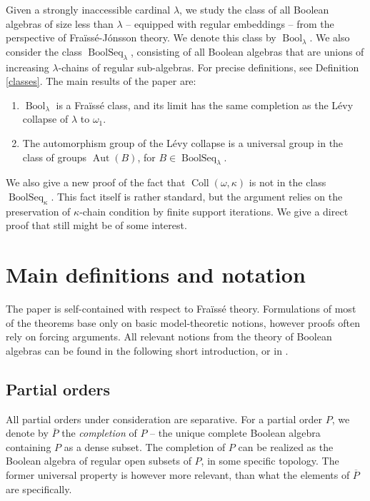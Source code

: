 \documentclass[11pt]{amsart}
\theoremstyle{definition}
\DeclareMathOperator{\Bool}{Bool}
\DeclareMathOperator{\BoolSeq}{BoolSeq}
\newcommand{\aut}{\operatorname{Aut}}
\newcommand{\coll}{\operatorname{Coll}(\omega,\kappa)}
\begin{document}
Given a strongly inaccessible cardinal $\lambda$, we study the class of all Boolean algebras of size less than $\lambda$ -- equipped with regular embeddings -- from the perspective of Fra\"iss\'e-J\'onsson theory. We denote this class by $\Bool_\lambda$. We also consider the class $\BoolSeq_\lambda$, consisting of all Boolean algebras that are unions of increasing $\lambda$-chains of regular sub-algebras. For precise definitions, see Definition \ref{classes}. The main results of the paper are:
\begin{enumerate}
    \item[A.] $\Bool_\lambda$ is a Fra\"iss\'e class, and its limit has the same completion as the L\'evy collapse of $\lambda$ to $\omega_1$. 
    \item[B.] The automorphism group of the L\'evy collapse is a universal group in the class of groups $\aut(B)$, for $B \in \BoolSeq_\lambda$. 
\end{enumerate}
We also give a new proof of the fact that $\coll$ is not in the class $\BoolSeq_\kappa$. This fact itself is rather standard, but the argument relies on the preservation of $\kappa$-chain condition by finite support iterations. We give a direct proof that still might be of some interest.


\section{Main definitions and notation}

The paper is self-contained with respect to Fra\"iss\'e theory. Formulations of most of the theorems base only on basic model-theoretic notions, however proofs often rely on forcing arguments. All relevant notions from the theory of Boolean algebras can be found in the following short introduction, or in \cite{bool}.

\subsection{Partial orders}

All partial orders under consideration are separative. For a partial order $P$, we denote by $\overline P$ the \emph{completion} of $P$ -- the unique complete Boolean algebra containing $P$ as a dense subset. The completion of $P$ can be realized as the Boolean algebra of regular open subsets of $P$, in some specific topology. The former universal property is however more relevant, than what the elements of $\overline P$ are specifically. 
\end{document}
